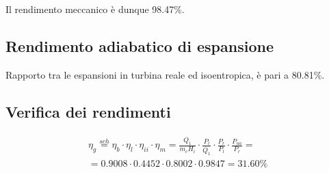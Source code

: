 Il rendimento meccanico è dunque 98.47\%.

\subsection{Rendimento adiabatico di espansione}
Rapporto tra le espansioni in turbina reale ed isoentropica, è pari a 80.81\%.

\subsection{Verifica dei rendimenti}
\begin{align*}
    \eta_g \stackrel{sch}{=} \eta_b \cdot \eta_l \cdot \eta_{ii} \cdot \eta_m
    = \frac{\dot{Q_1}}{\dot{m}_c H_i}\cdot \frac{P_l}{\dot{Q_1}} \cdot \frac{P_r}{P_l}\cdot \frac{P_{ua}}{P_r} = \\
    =  0.9008 \cdot 0.4452 \cdot 0.8002 \cdot 0.9847 = 31.60 \%
\end{align*}
